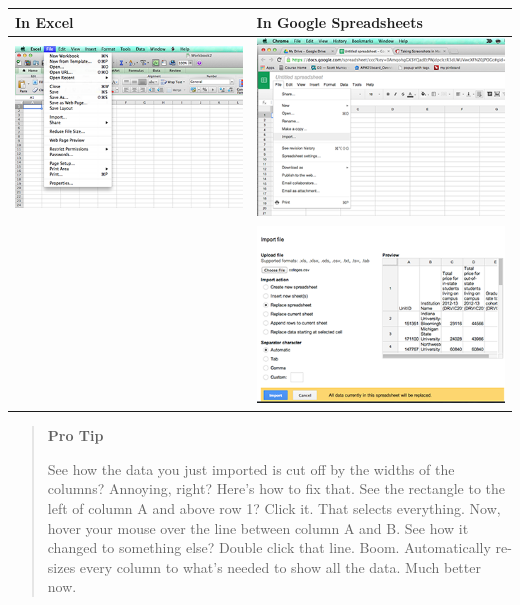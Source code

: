 \documentclass[]{book}
\begin{document}
\begin{longtable}[]{@{}ll@{}}
\toprule
In Excel & In Google Spreadsheets\tabularnewline
\midrule
\endhead
\includegraphics{images/excelmean3.png} & \includegraphics{images/googlemean3.png}\tabularnewline
& \includegraphics{images/googlemean4.png}\tabularnewline
\bottomrule
\end{longtable}

\begin{quote}
\textbf{Pro Tip}

See how the data you just imported is cut off by the widths of the columns? Annoying, right? Here's how to fix that. See the rectangle to the left of column A and above row 1? Click it. That selects everything. Now, hover your mouse over the line between column A and B. See how it changed to something else? Double click that line. Boom. Automatically re-sizes every column to what's needed to show all the data. Much better now.
\end{quote}
\end{document}
